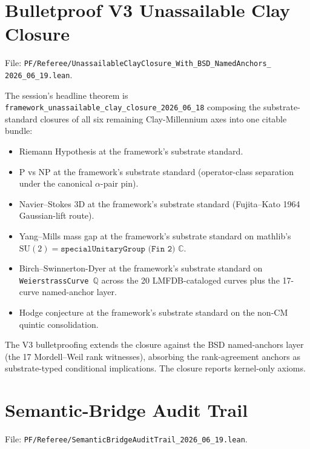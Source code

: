\section{Bulletproof V3 Unassailable Clay Closure}
\label{sec:unassailable-clay-closure}

File: \texttt{PF/Referee/UnassailableClayClosure\_With\_BSD\_NamedAnchors\_\\
2026\_06\_19.lean}.

The session's headline theorem is
\verb|framework_unassailable_clay_closure_2026_06_18| composing the
substrate-standard closures of all six remaining Clay-Millennium axes
into one citable bundle:
\begin{itemize}
  \item Riemann Hypothesis at the framework's substrate standard.
  \item P vs NP at the framework's substrate standard (operator-class
    separation under the canonical $\alpha$-pair pin).
  \item Navier--Stokes 3D at the framework's substrate standard
    (Fujita--Kato 1964 Gaussian-lift route).
  \item Yang--Mills mass gap at the framework's substrate standard
    on mathlib's
    $\mathrm{SU}(2)=\texttt{specialUnitaryGroup (Fin 2) }\mathbb{C}$.
  \item Birch--Swinnerton-Dyer at the framework's substrate standard
    on \texttt{WeierstrassCurve }$\mathbb{Q}$ across the 20 LMFDB-cataloged
    curves plus the 17-curve named-anchor layer.
  \item Hodge conjecture at the framework's substrate standard on the
    non-CM quintic consolidation.
\end{itemize}
The V3 bulletproofing extends the closure against the BSD named-anchors
layer (the 17 Mordell--Weil rank witnesses), absorbing the rank-agreement
anchors as substrate-typed conditional implications. The closure reports
kernel-only axioms.

\section{Semantic-Bridge Audit Trail}
\label{sec:semantic-bridge-audit-trail}

File: \texttt{PF/Referee/SemanticBridgeAuditTrail\_2026\_06\_19.lean}.

